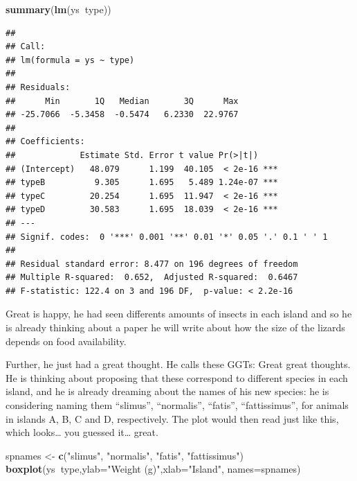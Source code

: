 \documentclass[
]{book}
\newenvironment{Shaded}{\begin{snugshade}}{\end{snugshade}}
\newcommand{\DataTypeTok}[1]{\textcolor[rgb]{0.13,0.29,0.53}{#1}}
\newcommand{\KeywordTok}[1]{\textcolor[rgb]{0.13,0.29,0.53}{\textbf{#1}}}
\newcommand{\NormalTok}[1]{#1}
\newcommand{\OperatorTok}[1]{\textcolor[rgb]{0.81,0.36,0.00}{\textbf{#1}}}
\newcommand{\StringTok}[1]{\textcolor[rgb]{0.31,0.60,0.02}{#1}}
\begin{document}
\begin{Shaded}
\begin{Highlighting}[]
\KeywordTok{summary}\NormalTok{(}\KeywordTok{lm}\NormalTok{(ys}\OperatorTok{~}\NormalTok{type))}
\end{Highlighting}
\end{Shaded}

\begin{verbatim}
## 
## Call:
## lm(formula = ys ~ type)
## 
## Residuals:
##      Min       1Q   Median       3Q      Max 
## -25.7066  -5.3458  -0.5474   6.2330  22.9767 
## 
## Coefficients:
##             Estimate Std. Error t value Pr(>|t|)    
## (Intercept)   48.079      1.199  40.105  < 2e-16 ***
## typeB          9.305      1.695   5.489 1.24e-07 ***
## typeC         20.254      1.695  11.947  < 2e-16 ***
## typeD         30.583      1.695  18.039  < 2e-16 ***
## ---
## Signif. codes:  0 '***' 0.001 '**' 0.01 '*' 0.05 '.' 0.1 ' ' 1
## 
## Residual standard error: 8.477 on 196 degrees of freedom
## Multiple R-squared:  0.652,	Adjusted R-squared:  0.6467 
## F-statistic: 122.4 on 3 and 196 DF,  p-value: < 2.2e-16
\end{verbatim}

Great is happy, he had seen differents amounts of insects in each island and so he is already thinking about a paper he will write about how the size of the lizards depends on food availability.

Further, he just had a great thought. He calls these GGTs: Great great thoughts. He is thinking about proposing that these correspond to different species in each island, and he is already dreaming about the names of his new species: he is considering naming them ``slimus'', ``normalis'', ``fatis'', ``fattissimus'', for animals in islands A, B, C and D, respectively. The plot would then read just like this, which looks\ldots{} you guessed it\ldots{} great.

\begin{Shaded}
\begin{Highlighting}[]
\NormalTok{spnames <-}\StringTok{ }\KeywordTok{c}\NormalTok{(}\StringTok{"slimus"}\NormalTok{, }\StringTok{"normalis"}\NormalTok{, }\StringTok{"fatis"}\NormalTok{, }\StringTok{"fattissimus"}\NormalTok{)}
\KeywordTok{boxplot}\NormalTok{(ys}\OperatorTok{~}\NormalTok{type,}\DataTypeTok{ylab=}\StringTok{"Weight (g)"}\NormalTok{,}\DataTypeTok{xlab=}\StringTok{"Island"}\NormalTok{,}
\DataTypeTok{names=}\NormalTok{spnames)}
\end{Highlighting}
\end{Shaded}
\end{document}
